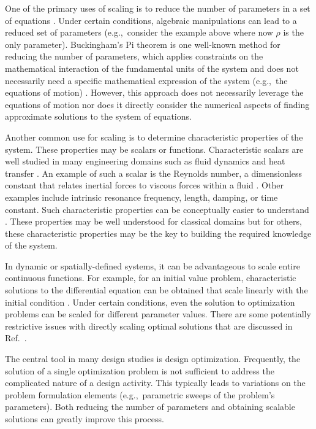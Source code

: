 One of the primary uses of scaling is to reduce the number of parameters in a set of equations \cite{Cengel2006a, Groesen2007a,Holmes2009a}.
Under certain conditions, algebraic manipulations can lead to a reduced set of parameters (e.g.,~consider the example above where now $\rho$ is the only parameter).
Buckingham's Pi theorem is one well-known method for reducing the number of parameters, which applies constraints on the mathematical interaction of the fundamental units of the system and does not necessarily need a specific mathematical expression of the system (e.g.,~the equations of motion) \cite{Buckingham1914a, Holmes2009a, Groesen2007a}.
However, this approach does not necessarily leverage the equations of motion nor does it directly consider the numerical aspects of finding approximate solutions to the system of equations. 

Another common use for scaling is to determine characteristic properties of the system. These properties may be scalars or functions. Characteristic scalars are well studied in many engineering domains such as fluid dynamics and heat transfer \cite{Cengel2006a}. An example of such a scalar is the Reynolds number, a dimensionless constant that relates inertial forces to viscous forces within a fluid \cite{Cengel2006a}. Other examples include intrinsic resonance frequency, length, damping, or time constant.  Such characteristic properties can be conceptually easier to understand \cite{Holmes2009a}.
These properties may be well understood for classical domains but for others, these characteristic properties may be the key to building the required knowledge of the system.

In dynamic or spatially-defined systems, it can be advantageous to scale entire continuous functions. For example, for an initial value problem, characteristic solutions to the differential equation can be obtained that scale linearly with the initial condition \cite{Holmes2009a}. Under certain conditions, even the solution to optimization problems can be scaled for different parameter values. There are some potentially restrictive issues with directly scaling optimal solutions that are discussed in Ref.~\cite{Kittirungsi2008a}. 

The central tool in many design studies is design optimization.
Frequently, the solution of a single optimization problem is not sufficient to address the complicated nature of a design activity.
This typically leads to variations on the problem formulation elements (e.g.,~parametric sweeps of the problem's parameters).
Both reducing the number of parameters and obtaining scalable solutions can greatly improve this process.


